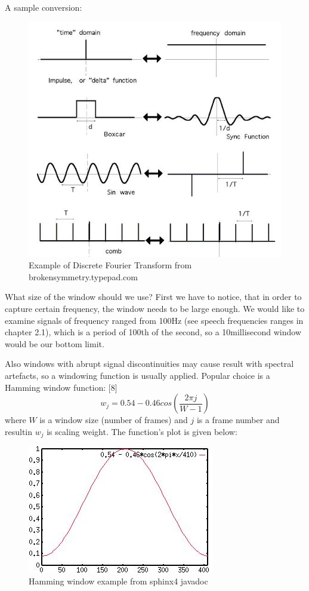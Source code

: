 \documentclass[12pt,a4paper,english]{article}
\begin{document}
\newpage
A sample conversion:
\begin{figure}[hb]
    \centering
    \includegraphics[scale=0.3]{sample_dft_conversion.jpg}
    \caption[]{Example of Discrete Fourier Transform from brokensymmetry.typepad.com}
\end{figure}

What size of the window should we use? First we have to notice, that in order to capture certain frequency, the window needs to be large enough. We would like to examine signals of frequency ranged from 100Hz (see speech frequencies ranges in chapter 2.1), which is a period of 100th of the second, so a 10millisecond window would be our bottom limit. \newline

Also windows with abrupt signal discontinuities may cause result with spectral artefacts, so a windowing function is usually applied. Popular choice is a Hamming window function: [8]
\begin{equation}
   w_j = 0.54 - 0.46 cos(\frac{2 \pi j}{W - 1}) 
\end{equation}
where $W$ is a window size (number of frames) and $j$ is a frame number and resultin $w_j$ is scaling weight.
The function's plot is given below:
\begin{figure}[hb]
    \centering
    \includegraphics[scale=0.5]{hamming_window.jpg}
    \caption[]{Hamming window example from sphinx4 javadoc}
\end{figure}
\end{document}
